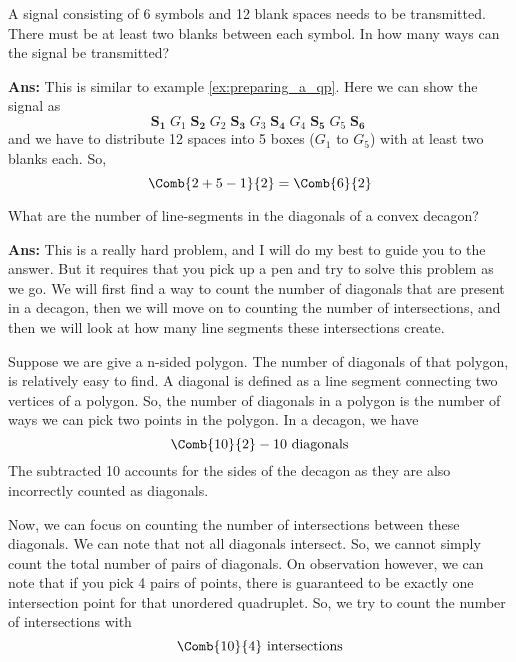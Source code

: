 \begin{example}
    A signal consisting of 6 symbols and 12 blank spaces needs to be transmitted. There must be at least two blanks between each symbol. In how many ways can the signal be transmitted?

    \textbf{Ans:} This is similar to example \ref{ex:preparing_a_qp}. Here we can show the signal as
    \[
        \mathbf{S_1}\; G_1 \;\mathbf{S_2}\;G_2\;\mathbf{S_3}\;G_3\;\mathbf{S_4}\;G_4\;\mathbf{S_5}\;G_5\;\mathbf{S_6}\;
    \]
    and we have to distribute 12 spaces into 5 boxes (\mbox{$G_1$} to \mbox{$G_5$}) with at least two blanks each. So,
    \[
        \Comb{2+5-1}{2} = \Comb{6}{2}
    \]
\end{example}

\begin{case_study}
    What are the number of line-segments in the diagonals of a convex decagon?

    \textbf{Ans:} This is a really hard problem, and I will do my best to guide you to the answer. But it requires that you pick up a pen and try to solve this problem as we go. We will first find a way to count the number of diagonals that are present in a decagon, then we will move on to counting the number of intersections, and then we will look at how many line segments these intersections create.

    Suppose we are give a n-sided polygon. The number of diagonals of that polygon, is relatively easy to find. A diagonal is defined as a line segment connecting two vertices of a polygon. So, the number of diagonals in a polygon is the number of ways we can pick two points in the polygon. In a decagon, we have
    \[
        \Comb{10}{2} - 10 \text{ diagonals}
    \]
    The subtracted 10 accounts for the sides of the decagon as they are also incorrectly counted as diagonals.

    Now, we can focus on counting the number of intersections between these diagonals. We can note that not all diagonals intersect. So, we cannot simply count the total number of pairs of diagonals. On observation however, we can note that if you pick 4 pairs of points, there is guaranteed to be exactly one intersection point for that unordered quadruplet. So, we try to count the number of intersections with
    \[
        \Comb{10}{4} \text{ intersections}
    \]


\end{case_study}
